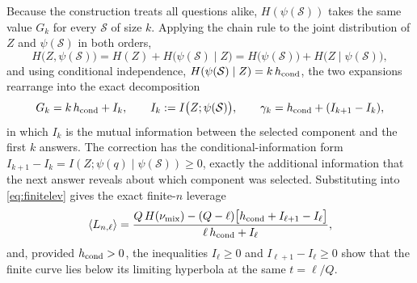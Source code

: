 Because the construction treats all questions alike, $H(\psi(\mathcal S))$ takes the same value $G_k$ for every $\mathcal S$ of size $k$.
Applying the chain rule to the joint distribution of $Z$ and
$\psi(\mathcal S)$ in both orders,
%
\begin{equation}
  H\big(Z,\psi(\mathcal S)\big)
  = H(Z) + H\big(\psi(\mathcal S)\mid Z\big)
  = H\big(\psi(\mathcal S)\big) + H\big(Z\mid\psi(\mathcal S)\big),
  \label{eq:coinchain}
\end{equation}
%
and using conditional independence,
$H(\psi(\mathcal S)\mid Z) = k\,h_{\rm cond}$, the two expansions
rearrange into the exact decomposition
%
\begin{equation}
  G_k = k\,h_{\rm cond} + I_k,
  \qquad
  I_k := I\big(Z;\psi(\mathcal S)\big),
  \qquad
  \gamma_k = h_{\rm cond} + (I_{k+1}-I_k),
  \label{eq:coindecomp}
\end{equation}
%
in which $I_k$ is the mutual information between the selected
component and the first $k$ answers. The correction has the
conditional-information form
$I_{k+1}-I_k = I(Z;\psi(q)\mid\psi(\mathcal S)) \ge 0$, exactly the
additional information that the next answer reveals about which
component was selected. Substituting into \eqref{eq:finitelev} gives
the exact finite-$n$ leverage
%
\begin{equation}
  \langle L_{n,\ell}\rangle
  = \frac{Q\,H(\nu_{\rm mix})
    - (Q-\ell)\big[h_{\rm cond} + I_{\ell+1}-I_\ell\big]}
    {\ell\,h_{\rm cond} + I_\ell},
  \label{eq:coinfinitelev}
\end{equation}
%
and, provided $h_{\rm cond} > 0$, the inequalities $I_\ell \ge 0$ and
$I_{\ell+1}-I_\ell \ge 0$ show that the finite curve lies below its
limiting hyperbola at the same $t = \ell/Q$.


